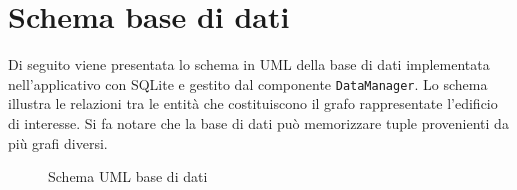 \documentclass[../DefinizioneDiProdotto.tex]{subfiles}
\begin{document}
\section{Schema base di dati}

	Di seguito viene presentata lo schema in UML della base di dati implementata nell'applicativo con SQLite e gestito dal componente \verb|DataManager|. Lo schema illustra le relazioni tra le entità che costituiscono il grafo rappresentate l'edificio di interesse. Si fa notare che la base di dati può memorizzare tuple provenienti da più grafi diversi.

	\begin{figure} [h]
			\caption{Schema UML base di dati}
			\label{???}
	\end{figure}
\end{document}
